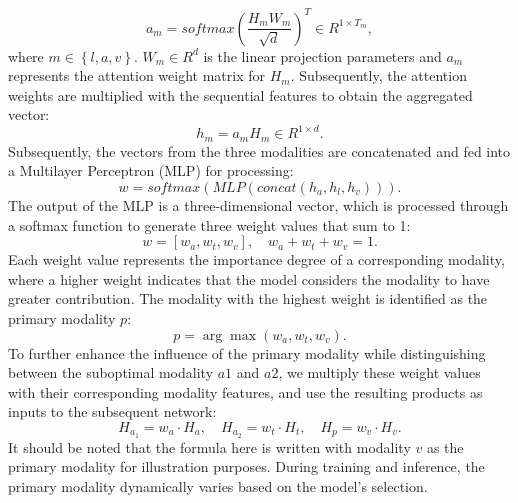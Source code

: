 \documentclass[letterpaper]{article} %
\begin{document}
\begin{equation}
    a_{m} = softmax\left( \frac{H_{m}W_{m}}{\sqrt{d}}\right)^{T}\in R^{1 \times T_{m}},
\end{equation}
where $m \in \left\{ l, a, v \right\}$. $W_{m} \in R^{ d}$ is the linear projection parameters and $a_{m}$ represents the attention weight matrix for $H_{m}$. Subsequently, the attention weights are multiplied with the sequential features to obtain the aggregated vector:
\begin{equation}
h_{m} = a_{m}H_{m} \in R^{1\times d}.
\end{equation}
Subsequently, the vectors from the three modalities are concatenated and fed into a Multilayer Perceptron (MLP) for processing:
\begin{equation}
   w=softmax(MLP( concat(h_a, h_l, h_v))).
\end{equation}
The output of the MLP is a three-dimensional vector, which is processed through a softmax function to generate three weight values that sum to 1:
\begin{equation}
    w = [w_a, w_t, w_v], \quad w_a + w_t + w_v = 1.
\end{equation}
Each weight value represents the importance degree of a corresponding modality, where a higher weight indicates that the model considers the modality to have greater contribution. The modality with the highest weight is identified as the primary modality $p$:
\begin{equation}
    p = \arg\max(w_a, w_t, w_v).
\end{equation}
To further enhance the influence of the primary modality while distinguishing between the suboptimal modality $a1$ and $a2$, we multiply these weight values with their corresponding modality features, and use the resulting products as inputs to the subsequent network:
\begin{equation}
    H_{a_1} = w_a \cdot H_a, \quad H_{a_2} = w_t \cdot H_t, \quad H_p= w_v \cdot H_v.
\end{equation}
It should be noted that the formula here is written with modality $v$ as the primary modality for illustration purposes. During training and inference, the primary modality dynamically varies based on the model's selection.
\end{document}
